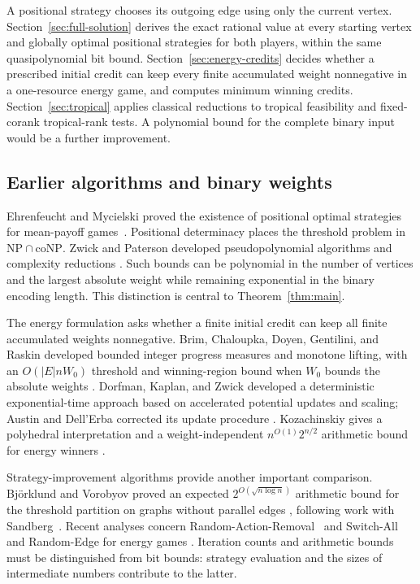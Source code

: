 A positional strategy chooses its outgoing edge using only the current
vertex. Section~\ref{sec:full-solution} derives the exact rational
value at every starting vertex and globally optimal positional
strategies for both players, within the same quasipolynomial bit bound.
Section~\ref{sec:energy-credits} decides whether a prescribed initial
credit can keep every finite accumulated weight nonnegative in a
one-resource energy game, and computes minimum winning credits. Section~\ref{sec:tropical}
applies classical reductions to tropical feasibility and fixed-corank
tropical-rank tests. A polynomial bound for the complete binary input
would be a further improvement.

\subsection{Earlier algorithms and binary weights}

Ehrenfeucht and Mycielski proved the existence of positional optimal
strategies for mean-payoff games~\cite{EhrenfeuchtMycielski1979}.
Positional determinacy places the threshold problem in
$\mathrm{NP}\cap\mathrm{coNP}$. Zwick and Paterson developed
pseudopolynomial algorithms and complexity reductions
\cite{ZwickPaterson1996}. Such bounds
can be polynomial in the number of vertices and the largest absolute
weight while remaining exponential in the binary encoding length.
This distinction is central to Theorem~\ref{thm:main}.

The energy formulation asks whether a finite initial credit can keep
all finite accumulated weights nonnegative. Brim, Chaloupka, Doyen,
Gentilini, and Raskin developed bounded integer progress measures and
monotone lifting, with an $O(|E|nW_0)$ threshold and winning-region
bound when $W_0$ bounds the absolute weights
\cite[Theorem~8]{BrimEtAl2011}.
Dorfman, Kaplan, and Zwick developed a deterministic exponential-time
approach based on accelerated potential updates and scaling; Austin
and Dell'Erba corrected its update procedure
\cite{DorfmanKaplanZwick2019,AustinDellErba2023}. Kozachinskiy
gives a polyhedral interpretation and a weight-independent
$n^{O(1)}2^{n/2}$ arithmetic bound for energy winners
\cite{Kozachinskiy2021}.

Strategy-improvement algorithms provide another important comparison.
Bj\"orklund and Vorobyov proved an expected
$2^{O(\sqrt{n\log n})}$ arithmetic bound for the threshold partition
on graphs without parallel edges
\cite[Theorem~7.1]{BjorklundVorobyov2007}, following work with
Sandberg~\cite{BjorklundSandbergVorobyov2004}.
Recent analyses concern Random-Action-Removal~\cite{Zwick2026} and
Switch-All and Random-Edge for energy games
\cite{DorfmanKaplanZwick2026}. Iteration counts and arithmetic bounds
must be distinguished from bit bounds: strategy evaluation and the
sizes of intermediate numbers contribute to the latter.


